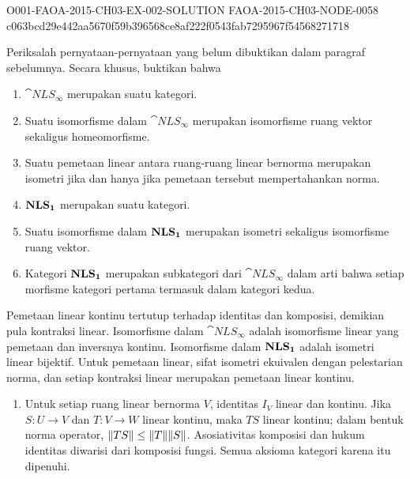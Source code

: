 \begin{o001solution}
  {O001-FAOA-2015-CH03-EX-002-SOLUTION}
  {FAOA-2015-CH03-NODE-0058}
  {c063bcd29e442aa5670f59b396568ce8af222f0543fab7295967f54568271718}
\begin{o001statement}
Periksalah pernyataan-pernyataan yang belum dibuktikan dalam paragraf
sebelumnya. Secara khusus, buktikan bahwa
 \begin{enumerate}
    \item[(a)] $\cat{NLS_{\boldsymbol\infty}}$ merupakan suatu kategori.
    \item[(b)] Suatu isomorfisme dalam $\cat{NLS_{\boldsymbol\infty}}$ merupakan
isomorfisme ruang vektor sekaligus homeomorfisme.
    \item[(c)] Suatu pemetaan linear antara ruang-ruang linear bernorma merupakan isometri
jika dan hanya jika pemetaan tersebut mempertahankan norma.
    \item[(d)] $\mathbf{NLS_{\mathbf{1}}}$ merupakan suatu kategori.
    \item[(e)] Suatu isomorfisme dalam $\mathbf{NLS_{\mathbf{1}}}$ merupakan isometri sekaligus
isomorfisme ruang vektor.
    \item[(f)] Kategori $\mathbf{NLS_{\mathbf{1}}}$ merupakan subkategori dari
$\cat{NLS_{\boldsymbol\infty}}$ dalam arti bahwa setiap morfisme kategori pertama
termasuk dalam kategori kedua.
 \end{enumerate}
\end{o001statement}
\begin{o001answer}
Pemetaan linear kontinu tertutup terhadap identitas dan komposisi, demikian
pula kontraksi linear. Isomorfisme dalam
$\cat{NLS_{\boldsymbol\infty}}$ adalah isomorfisme linear yang pemetaan dan
inversnya kontinu. Isomorfisme dalam $\mathbf{NLS_{\mathbf{1}}}$ adalah isometri
linear bijektif. Untuk pemetaan linear, sifat isometri ekuivalen dengan
pelestarian norma, dan setiap kontraksi linear merupakan pemetaan linear
kontinu.
\end{o001answer}
\begin{o001proof}
\begin{enumerate}
\item[(a)] Untuk setiap ruang linear bernorma $V$, identitas $I_V$ linear dan
kontinu. Jika $S\colon U\to V$ dan $T\colon V\to W$ linear kontinu, maka
$TS$ linear kontinu; dalam bentuk norma operator,
$\lVert TS\rVert\le\lVert T\rVert\lVert S\rVert$. Asosiativitas komposisi dan hukum identitas
diwarisi dari komposisi fungsi. Semua aksioma kategori karena itu dipenuhi.


\end{enumerate}
\end{o001proof}
\end{o001solution}
